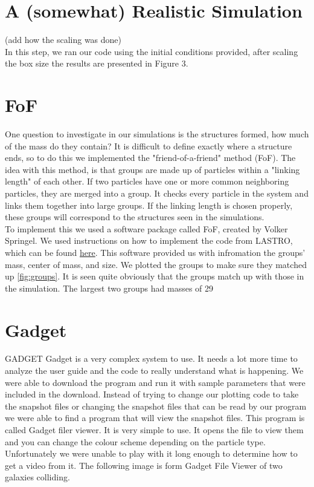 \documentclass[10pt]{article}
\begin{document}
\section{A (somewhat) Realistic Simulation}
(add how the scaling was done)\\ 
	In this step, we ran our code using the initial conditions provided, after scaling the box size the results are presented in Figure 3.   

\section{FoF}
One question to investigate in our simulations is the structures formed, how much of the mass do they contain? It is difficult to define exactly where a structure ends, so to do this we implemented the "friend-of-a-friend" method (FoF). The idea with this method, is that groups are made up of particles within a "linking length" of each other. If two particles have one or more common neighboring particles, they are merged into a group. It checks every particle in the system and links them together into large groups. If the linking length is chosen properly, these groups will correspond to the structures seen in the simulations.\\
To implement this we used a software package called FoF, created by Volker Springel. We used instructions on how to implement the code from LASTRO, which can be found \href{http://obswww.unige.ch/lastro/misc/TP4/doc/rst/Exercices/Ex05.html#extracting-haloes}{here}. This software provided us with infromation the groups' mass, center of mass, and size. We plotted the groups to make sure they matched up \ref{fig:groups}{}. It is seen quite obviously that the groups match up with those in the simulation. The largest two groups had masses of 29%

\section{Gadget}
GADGET
Gadget  is a very complex system to use. It needs a lot more time to analyze the user guide and the code to really understand what is happening. We were able to download the program and run it with sample parameters that were included in the download. Instead of trying to change our plotting code to take the snapshot files or changing the snapshot files that can be read by our program we were able to find a program that will view the snapshot files. This program is called Gadget filer viewer. It is very simple to use. It opens the file to view them and you can change the colour scheme depending on the particle type. Unfortunately we were unable to play with it long enough to determine how to get a video from it. The following image is form Gadget File Viewer of two galaxies colliding. 
\end{document}
